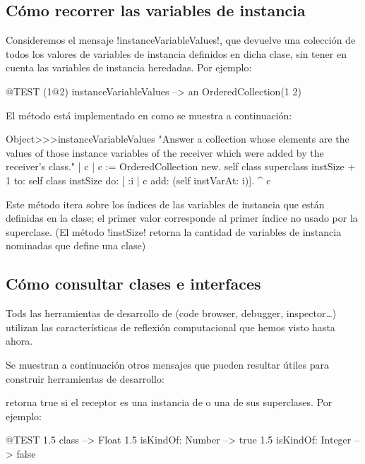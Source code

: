 \documentclass[a4paper,10pt,twoside]{book}
\begin{document}
\subsection{Cómo recorrer las variables de instancia}

Consideremos el mensaje \ct!instanceVariableValues!, que devuelve una
colección de todos los valores de variables de instancia definidos en
dicha clase, sin tener en cuenta las variables de instancia
heredadas.  Por ejemplo:
\begin{code}{@TEST}
(1@2) instanceVariableValues --> an OrderedCollection(1 2)
\end{code}

El método está implementado en  como se muestra a
continuación:
\begin{code}{}
Object>>>instanceVariableValues
        "Answer a collection whose elements are the values of those instance variables of the receiver which were added by the receiver's class."
        | c |
        c := OrderedCollection new.
        self class superclass instSize + 1
                to: self class instSize
                do: [ :i | c add: (self instVarAt: i)].
        ^ c
\end{code}

Este método itera sobre los índices de las variables de instancia que
están definidas en la clase; el primer valor corresponde al primer
índice no usado por la superclase.  (El método \ct!instSize! retorna
la cantidad de variables de instancia nominadas que define una clase)

\subsection{Cómo consultar clases e interfaces}

Tods las herramientas de desarrollo de \pharo (code browser,
debugger, inspector\ldots) utilizan las características de reflexión
computacional que hemos visto hasta ahora.

Se muestran a continuación otros mensajes que pueden resultar útiles
para construir herramientas de desarrollo:

 retorna true si el receptor es una
instancia de  o una de sus superclases.  Por
ejemplo:
\begin{code}{@TEST}
1.5 class                     --> Float
1.5 isKindOf: Number --> true
1.5 isKindOf: Integer   --> false
\end{code}
\end{document}
